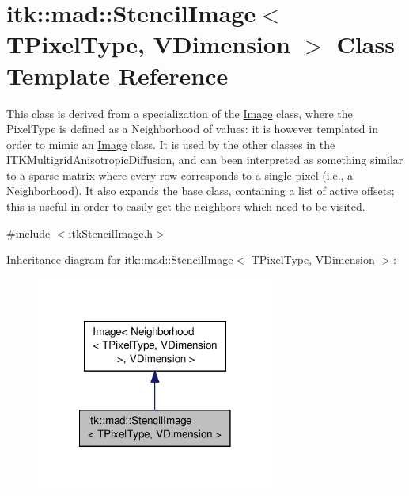 \hypertarget{classitk_1_1mad_1_1_stencil_image}{\section{itk\-:\-:mad\-:\-:Stencil\-Image$<$ T\-Pixel\-Type, V\-Dimension $>$ Class Template Reference}
\label{classitk_1_1mad_1_1_stencil_image}
}


This class is derived from a specialization of the \hyperlink{class_image}{Image} class, where the Pixel\-Type is defined as a Neighborhood of values\-: it is however templated in order to mimic an \hyperlink{class_image}{Image} class. It is used by the other classes in the I\-T\-K\-Multigrid\-Anisotropic\-Diffusion, and can been interpreted as something similar to a sparse matrix where every row corresponds to a single pixel (i.\-e., a Neighborhood). It also expands the base class, containing a list of active offsets; this is useful in order to easily get the neighbors which need to be visited.  




{\ttfamily \#include $<$itk\-Stencil\-Image.\-h$>$}



Inheritance diagram for itk\-:\-:mad\-:\-:Stencil\-Image$<$ T\-Pixel\-Type, V\-Dimension $>$\-:
\nopagebreak
\begin{figure}[H]
\begin{center}
\leavevmode
\includegraphics[width=222pt]{classitk_1_1mad_1_1_stencil_image__inherit__graph}
\end{center}
\end{figure}


